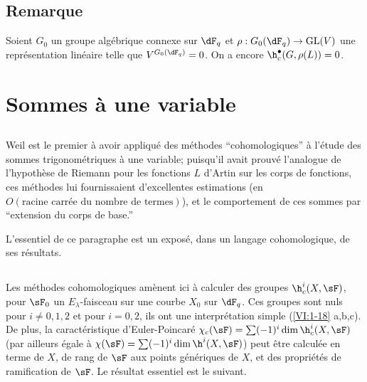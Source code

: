\subsection{Remarque}\label{VI:2-9}

Soient $G_0$ un groupe algébrique connexe sur $\dF_q$ et 
$\rho:G_0(\dF_q) \to \operatorname{GL}(V)$ une représentation linéaire 
telle que $V^{G_0(\dF_q)}=0$. On a encore $\h_c^\bullet(G,\rho(L))=0$. 










\section{Sommes à une variable}\label{VI:3}





\subsection{}\label{VI:3-1}

Weil est le premier à avoir appliqué des méthodes ``cohomologiques'' à 
l'étude des sommes trigonométriques à une variable; puisqu'il avait 
prouvé l'analogue de l'hypothèse de Riemann pour les fonctions $L$ d'Artin 
sur les corps de fonctions, ces méthodes lui fournissaient d'excellentes 
estimations (en $O(\text{racine carrée du nombre de termes})$), et le 
comportement de ces sommes par ``extension du corps de base.'' 

L'essentiel de ce paragraphe est un exposé, dans un langage cohomologique, de 
ses résultats. 





\subsection{}\label{VI:3-2}

Les méthodes cohomologiques amènent ici à calculer des groupes 
$\h_c^i(X,\sF)$, pour $\sF_0$ un $E_\lambda$-faisceau sur une courbe $X_0$ sur 
$\dF_q$. Ces groupes sont nuls pour $i\ne 0,1,2$ et pour 
$i=0,2$, ils ont une interprétation simple (\ref{VI:1-18} a,b,c). De plus, la 
caractéristique d'Euler-Poincaré 
$\chi_c(\sF) = \sum (-1)^i \dim \h_c^i(X,\sF)$ (par ailleurs égale à 
$\chi(\sF) = \sum (-1)^i \dim \h^i(X,\sF)$) peut être calculée en terme de 
$X$, de rang de $\sF$ aux points génériques de $X$, et des propriétés 
de ramification de $\sF$. Le résultat essentiel est le suivant. 

